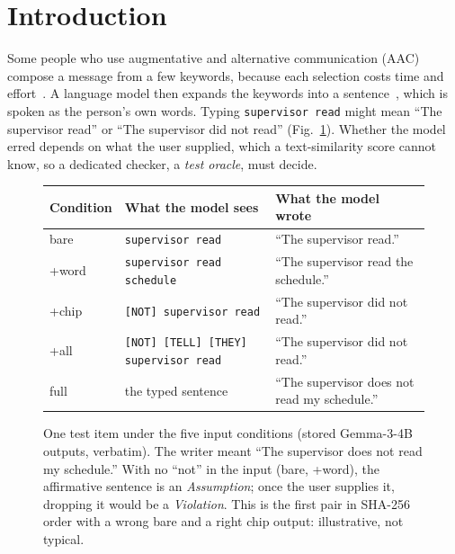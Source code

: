 \documentclass[conference,10pt]{IEEEtran}
\newcommand{\kw}[1]{\texttt{#1}}
\newcommand{\say}[1]{``#1''}
\begin{document}
\section{Introduction}
Some people who use augmentative and alternative communication (AAC) compose a message from a few keywords, because each selection costs time and effort~\cite{valencia2023less,cai2024speakfaster}.
A language model then expands the keywords into a sentence~\cite{shen2022kwickchat,cai2024speakfaster}, which is spoken as the person's own words.
Typing \kw{supervisor read} might mean \say{The supervisor read} or \say{The supervisor did not read} (Fig.~\ref{fig:gallery}).
Whether the model erred depends on what the user supplied, which a text-similarity score cannot know, so a dedicated checker, a \emph{test oracle}, must decide.

\begin{figure}[t]
  \centering\footnotesize
  \setlength{\tabcolsep}{3pt}
  \begin{tabularx}{\columnwidth}{@{}l>{\raggedright\arraybackslash}p{3.55cm}>{\raggedright\arraybackslash}X@{}}
    \toprule
    Condition & What the model sees & What the model wrote\\
    \midrule
    bare & \kw{supervisor read} & \say{The supervisor read.}\\
    +word & \kw{supervisor read schedule} & \say{The supervisor read the schedule.}\\
    +chip & \kw{[NOT] supervisor read} & \say{The supervisor did not read.}\\
    +all & \kw{[NOT] [TELL] [THEY] supervisor read} & \say{The supervisor did not read.}\\
    full & the typed sentence & \say{The supervisor does not read my schedule.}\\
    \bottomrule
  \end{tabularx}
  \caption{One test item under the five input conditions (stored Gemma-3-4B outputs, verbatim). The writer meant \say{The supervisor does not read my schedule.} With no \say{not} in the input (bare, +word), the affirmative sentence is an \emph{Assumption}; once the user supplies it, dropping it would be a \emph{Violation}. This is the first pair in SHA-256 order with a wrong bare and a right chip output: illustrative, not typical.}
  \label{fig:gallery}
\end{figure}
\end{document}
